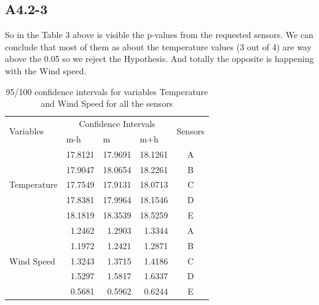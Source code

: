 \documentclass[a4paper,12pt]{article}
\begin{document}
\subsection{A4.2-3}
So in the Table 3 above is visible the p-values from the requested sensors. We can conclude that most of them as about the temperature values (3 out of 4) are way above the 0.05 so we reject the Hypothesis. And totally the opposite is happening with the Wind speed.
\begin{table}[]
	\centering
	\begin{tabular}{|l|r|r|r|c|}
		\hline
		\multirow{2}{*}{Variables}                         & \multicolumn{3}{c|}{Confidence Intervals}                                    & \multicolumn{1}{l|}{\multirow{2}{*}{Sensors}} \\ \cline{2-4}
		& \multicolumn{1}{l|}{m-h} & \multicolumn{1}{l|}{m} & \multicolumn{1}{l|}{m+h} & \multicolumn{1}{l|}{}                         \\ \hline
		\multicolumn{1}{|c|}{\multirow{5}{*}{Temperature}} & 17.8121                  & 17.9691                & 18.1261                  & A                                             \\ \cline{2-5} 
		\multicolumn{1}{|c|}{}                             & 17.9047                  & 18.0654                & 18.2261                  & B                                             \\ \cline{2-5} 
		\multicolumn{1}{|c|}{}                             & 17.7549                  & 17.9131                & 18.0713                  & C                                             \\ \cline{2-5} 
		\multicolumn{1}{|c|}{}                             & 17.8381                  & 17.9964                & 18.1546                  & D                                             \\ \cline{2-5} 
		\multicolumn{1}{|c|}{}                             & 18.1819                  & 18.3539                & 18.5259                  & E                                             \\ \hline
		\multirow{5}{*}{Wind Speed}                        & 1.2462                   & 1.2903                 & 1.3344                   & A                                             \\ \cline{2-5} 
		& 1.1972                   & 1.2421                 & 1.2871                   & B                                             \\ \cline{2-5} 
		& 1.3243                   & 1.3715                 & 1.4186                   & C                                             \\ \cline{2-5} 
		& 1.5297                   & 1.5817                 & 1.6337                   & D                                             \\ \cline{2-5} 
		& 0.5681                   & 0.5962                 & 0.6244                   & E                                             \\ \hline
	\end{tabular}
	\caption{95/100 confidence intervals for variables Temperature and Wind Speed for all the sensors}\cite{Maiullari2020}
\end{table}
\end{document}
